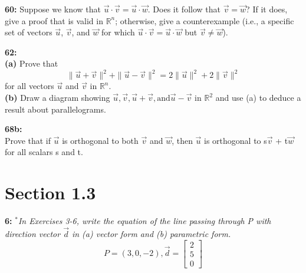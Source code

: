 \documentclass[12pt,letterpaper]{hmcpset}
\begin{document}

\pagebreak

\begin{problem}
\textbf{60:}  Suppose we know that $\vec{u} \cdot \vec{ v} = \vec{u} \cdot \vec{w}$. Does it follow that
$\vec{v} = \vec{w}$? If it does, give a proof that is valid in $\mathbb{R}^n$;
otherwise, give a counterexample (i.e., a specific set of
vectors $\vec{u}$, $\vec{v}$, and $\vec{w}$ for which $\vec{u} \cdot \vec{v} = \vec{u}\cdot \vec{w}$ but $\vec{v} \ne \vec{w}$).
\end{problem}


\vspace{180pt}
\pagebreak

\begin{problem}
\textbf{62:}\\
\textbf{(a) }  Prove that \[ \|\vec{u} + \vec{v}\|^2 + \|\vec{u} - \vec{v}\|^2 = 2\|\vec{u}\|^2 + 2\|\vec{v}\|^2 \]
for all vectors $\vec{u}$ and $\vec{v}$ in $\mathbb{R} ^n$. \\
\textbf{(b) } Draw a diagram showing $\vec{u}, \vec{v}, \vec{u} + \vec{v}, \text{and} \vec{u} - \vec{v}$
in $\mathbb{R}^2$ and use (a) to deduce a result about
parallelograms.
\end{problem}


\pagebreak

\begin{problem}
\textbf{68b:}\\
Prove that if $\vec{u}$ is orthogonal to both $\vec{v}$ and $\vec{w}$, then
$\vec{u}$ is orthogonal to s$\vec{v}$ + t$\vec{w}$ for all scalars s and t.
\end{problem}



\pagebreak
\section{Section 1.3}

\begin{problem}
\textbf{6:} \textit{$^*$In Exercises 3-6, write the equation of the line passing
through P with direction vector $\vec{d}$ in (a) vector form and
(b) parametric form.} \\
\[ P = (3,0,-2), \vec{d} = \begin{bmatrix} 2\\5\\0 \end{bmatrix} \]
\end{problem}
\end{document}
